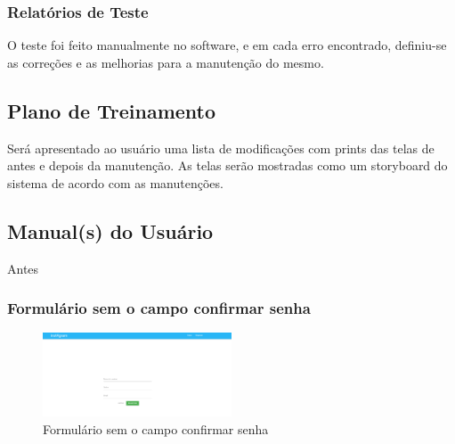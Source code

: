 \subsubsection{Relatórios de Teste}
O teste foi feito manualmente no software, e em cada erro encontrado, definiu-se as correções e as melhorias para a manutenção do mesmo.

\subsection{Plano de Treinamento}

 Será apresentado ao usuário uma lista de modificações com prints das telas de antes e depois da manutenção. 
 As telas serão mostradas como um storyboard do sistema de acordo com as manutenções.

\subsection{Manual(s) do Usuário}
Antes
\subsubsection{Formulário sem o campo confirmar senha}
\begin{figure}[ht]
	\centering
	\includegraphics[width=0.5\textwidth]{./imagens/confirmacao_senha.png}
	\caption{Formulário sem o campo confirmar senha}
	\label{fig:casoDeUso}
\end{figure}

\pagebreak

